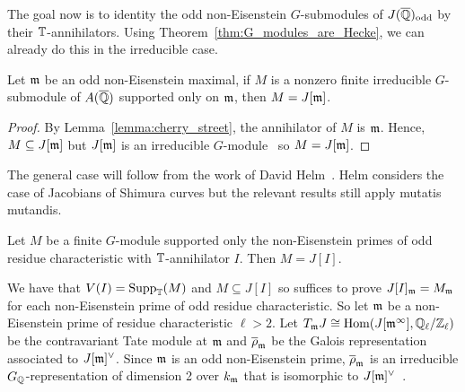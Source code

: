 \documentclass{article}
\newcommand{\odd}{\mathrm{odd}}
\begin{document}
The goal now is to identity the odd non-Eisenstein $G$-submodules of
$J(\QQbar)_\odd$ by their $\mathbb{T}$-annihilators. Using
Theorem~\ref{thm:G_modules_are_Hecke}, we can already do this in the
irreducible case.
\begin{corollary}
    Let $\mathfrak{m}$ be an odd non-Eisenstein maximal, if $M$ is a nonzero finite
    irreducible $G$-submodule of $A(\overline{\mathbb{Q}})$ supported only on $\mathfrak{m}$, then
    $M=J[\mathfrak{m}]$.
\end{corollary}
\begin{proof}
    By Lemma~\ref{lemma:cherry_street}, the annihilator of $M$ is $\mathfrak{m}$. Hence,
    $M\subseteq J[\mathfrak{m}]$ but $J[\mathfrak{m}]$ is an irreducible
    $G$-module~\cite[Proposition 14.2]{mazur:eisenstein} so $M=J[\mathfrak{m}]$.
\end{proof}

The general case will follow from the work of David Helm~\cite{helm:jacobian}.
Helm considers the case of Jacobians of Shimura curves but the relevant results
still apply mutatis mutandis.

\begin{theorem}%
    \label{thm:non_eisenstein_kernel_hecke}
    Let $M$ be a finite $G$-module supported only the non-Eisenstein primes of
    odd residue characteristic with $\mathbb{T}$-annihilator $I$. Then $M=J[I]$.
\end{theorem}

We have that $V(I)=\operatorname{Supp}_{\mathbb{T}}(M)$ and $M\subseteq J[I]$ so suffices to prove
$J[I]_{\mathfrak{m}} = M_{\mathfrak{m}}$ for each non-Eisenstein prime of odd residue characteristic.
So let $\mathfrak{m}$ be a non-Eisenstein prime of residue characteristic $\ell>2$. Let
$T_{\mathfrak{m}} J\cong \operatorname{Hom}(J[\mathfrak{m}^\infty], \mathbb{Q}_\ell/\mathbb{Z}_\ell)$ be the contravariant Tate
module at $\mathfrak{m}$ and $\overline{\rho}_{\mathfrak{m}}$ be the Galois representation associated
to $J[\mathfrak{m}]^\vee$. Since $\mathfrak{m}$ is an odd non-Eisenstein prime,
$\overline{\rho}_{\mathfrak{m}}$ is an irreducible $G_{\mathbb{Q}}$-representation of dimension 2
over $k_{\mathfrak{m}}$ that is isomorphic to $J[\mathfrak{m}]^\vee$~\cite[Prop.
14.2]{mazur:eisenstein}.
\end{document}
